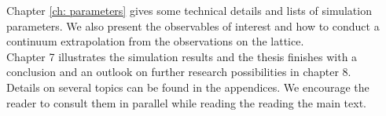 %
Chapter \ref{ch: parameters} gives some technical details and lists of simulation parameters. We also present the observables of interest and how to conduct a continuum extrapolation from the observations on the lattice.\\
%
Chapter 7 illustrates the simulation results and the thesis finishes with a conclusion and an outlook on further research possibilities in chapter 8.\\
%
Details on several topics can be found in the appendices. We encourage the reader to consult them in parallel while reading the reading the main text.

